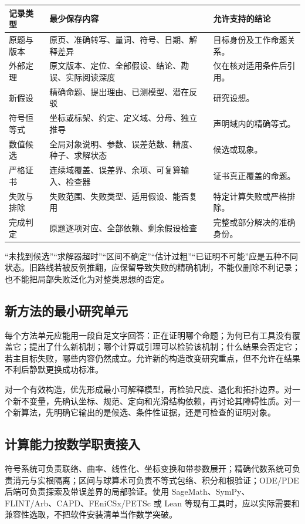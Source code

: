 \documentclass[11pt,a4paper]{article}
\theoremstyle{definition}
\begin{document}
\begin{longtable}{P{0.21\textwidth}P{0.43\textwidth}P{0.27\textwidth}}
\toprule
记录类型 & 最少保存内容 & 允许支持的结论\\\midrule\endhead
原题与版本 & 原页、准确转写、量词、符号、日期、解释差异 & 目标身份及工作命题关系。\\
外部定理 & 原文版本、定位、全部假设、结论、勘误、实际阅读深度 & 仅在核对适用条件后引用。\\
新假设 & 精确命题、提出理由、已测模型、潜在反驳 & 研究设想。\\
符号恒等式 & 坐标或标架、约定、定义域、分母、独立推导 & 声明域内的精确等式。\\
数值候选 & 全局对象说明、参数、误差范数、精度、种子、求解状态 & 候选或现象。\\
严格证书 & 连续域覆盖、误差界、余项、可复算输入、检查器 & 证书真正覆盖的命题。\\
失败与排除 & 失败范围、失败类型、适用假设、能否复用 & 特定计算失败或严格排除。\\
完成判定 & 原题逐项对应、全部依赖、剩余假设检查 & 完整或部分解决的准确身份。\\\bottomrule
\end{longtable}

“未找到候选”“求解器超时”“区间不确定”“估计过粗”“已证明不可能”应是五种不同状态。旧路线若被反例推翻，应保留导致失败的精确机制，不能仅删除不利记录；也不能把局部失败泛化为对整类思想的否定。

\subsection{新方法的最小研究单元}

每个方法单元应能用一段自足文字回答：正在证明哪个命题；为何已有工具没有覆盖它；提出了什么新机制；哪个计算或引理可以检验该机制；什么结果会否定它；若主目标失败，哪些内容仍然成立。允许新的构造改变研究重点，但不允许在结果不利后静默更换成功标准。

对一个有效构造，优先形成最小可解释模型，再检验尺度、退化和拓扑边界。对一个新不变量，先确认坐标、规范、定向和光滑结构依赖，再讨论其障碍性质。对一个新算法，先明确它输出的是候选、条件性证据，还是可检查的证明对象。

\subsection{计算能力按数学职责接入}

符号系统可负责联络、曲率、线性化、坐标变换和带参数展开；精确代数系统可负责消元与实根隔离；区间与球算术可负责不等式包络、积分和根验证；ODE/PDE 后端可负责探索及带误差界的局部验证。使用 SageMath、SymPy、FLINT/Arb、CAPD、FEniCSx/PETSc 或 Lean 等现有工具时，应以实际需要和兼容性选取，不把软件安装清单当作数学突破。
\end{document}
